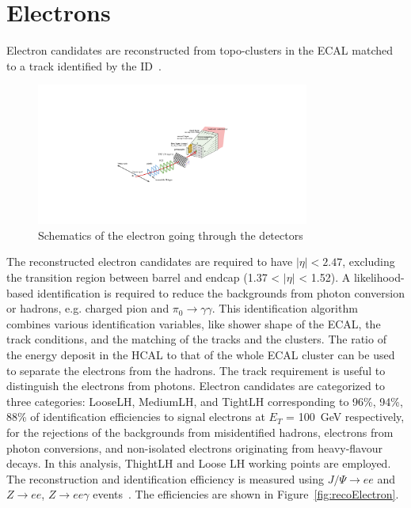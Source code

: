 \section{Electrons}
Electron candidates are reconstructed from topo-clusters in the ECAL matched to a track identified by the ID~\cite{ATL-PHYS-PUB-2017-022}.
\begin{figure}[tbp]
\begin{center}
 \includegraphics[width=0.80\textwidth,keepaspectratio]{figures/Reconstruction/electronPath}
\caption{
Schematics of the electron going through the detectors
}
\label{fig:electronPath}
\end{center}
\end{figure}
The reconstructed electron candidates are required to have $|\eta|<2.47$, excluding the transition region between barrel and endcap (1.37 < $|\eta|$ < 1.52).
A likelihood-based identification is required to reduce the backgrounds from photon conversion or hadrons, e.g. charged pion and $\pi_0 \rightarrow \gamma \gamma$. 
This identification algorithm combines various identification variables, like shower shape of the ECAL, the track conditions, and the matching of the tracks and the clusters. 
The ratio of the energy deposit in the HCAL to that of the whole ECAL cluster can be used to separate the electrons from the hadrons. 
The track requirement is useful to distinguish the electrons from photons.
Electron candidates are categorized to three categories: LooseLH, MediumLH, and TightLH corresponding to 96\%, 94\%, 88\% of identification efficiencies to signal electrons at $E_T$ = 100~GeV respectively, for the rejections of the backgrounds from misidentified hadrons, electrons from photon conversions, and non-isolated electrons originating from heavy-flavour decays. 
In this analysis, ThightLH and Loose LH working points are employed.
The reconstruction and identification efficiency is measured using  $J/\Psi \rightarrow ee$ and $Z\rightarrow ee$, $Z\rightarrow ee\gamma$ events~\cite{PERF-2017-01}. The efficiencies are shown in Figure~\ref{fig:recoElectron}. 
